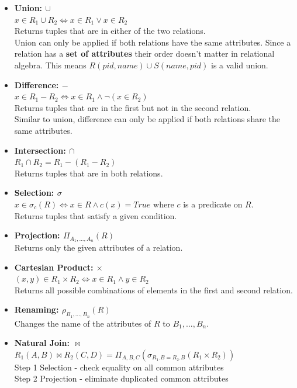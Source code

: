\begin{itemize}
\item \textbf{Union: $\cup$}\\
$x \in R_1 \cup R_2 \iff x \in R_1 \lor x \in R_2$\\
Returns tuples that are in either of the two relations.\\
Union can only be applied if both relations have the same attributes. Since a relation has a \textbf{set of attributes} their order doesn't matter in relational algebra. This means $R(pid, name) \cup S(name, pid)$ is a valid union.
\item  \textbf{Difference: $-$}\\
$x \in R_1 - R_2 \iff x \in R_1 \land \neg(x \in R_2)$\\
Returns tuples that are in the first but not in the second relation.\\
Similar to union, difference can only be applied if both relations share the same attributes.
\item \textbf{Intersection: $\cap$}\\
$R_1 \cap R_2 = R_1 - (R_1 - R_2)$\\
Returns tuples that are in both relations.
\item \textbf{Selection: $\sigma$}\\
$x \in \sigma_c(R) \iff x \in R \land c(x) = True$ where $c$ is a predicate on $R$.\\
Returns tuples that satisfy a given condition.
\item \textbf{Projection: $\Pi_{A_1, ..., A_n}(R)$}\\
Returns only the given attributes of a relation.
\item \textbf{Cartesian Product: $\times$}\\
$(x,y) \in R_1 \times R_2 \iff x \in R_1 \land y \in R_2$\\
Returns all possible combinations of elements in the first and second relation.
\item \textbf{Renaming: $\rho_{B_1, ..., B_n}(R)$}\\
Changes the name of the attributes of $R$ to $B_1, ..., B_n$.
\item \textbf{Natural Join: $\Join$}\\
$R_1(A,B) \Join R_2(C,D) = \Pi_{A,B,C}(\sigma_{R_1.B=R_2.B}(R_1 \times R_2))$\\
Step 1 Selection - check equality on all common attributes\\
Step 2 Projection - eliminate duplicated common attributes\\

\end{itemize}
